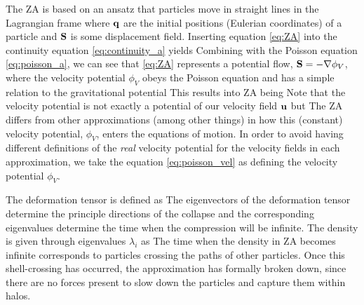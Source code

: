 The ZA is based on an ansatz that particles move in straight lines in the Lagrangian frame
where $\mathbf q$ are the initial positions (Eulerian coordinates) of a particle and $\mathbf S$ is some displacement field. Inserting equation \eqref{eq:ZA} into the continuity equation \eqref{eq:continuity_a} yields
Combining with the Poisson equation \eqref{eq:poisson_a}, we can see that \eqref{eq:ZA} represents a potential flow, $\mathbf S = -\nabla\phi_V$, where the velocity potential $\phi_V$ obeys the Poisson equation
and has a simple relation to the gravitational potential
This results into ZA being
Note that the velocity potential is not exactly a potential of our velocity field $\mathbf u$ but
The ZA differs from other approximations (among other things) in how this (constant) velocity potential, $\phi_V$, enters the equations of motion. In order to avoid having different definitions of the \textit{real} velocity potential for the velocity fields in each approximation, we take the equation \eqref{eq:poisson_vel} as defining the velocity potential $\phi_V$.

The deformation tensor is defined as
The eigenvectors of the deformation tensor determine the principle directions of the collapse and the corresponding eigenvalues determine the time when the compression will be infinite. The density is given through eigenvalues $\lambda_i$ as
The time when the density in ZA becomes infinite corresponds to particles crossing the paths of other particles. Once this shell-crossing has occurred, the approximation has formally broken down, since there are no forces present to slow down the particles and capture them within halos.

